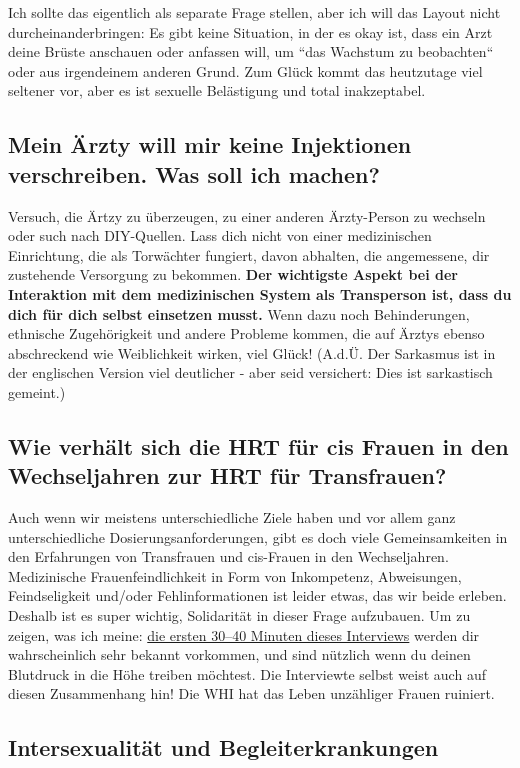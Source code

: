 \documentclass{article}
\begin{document}
Ich sollte das eigentlich als separate Frage stellen, aber ich will das Layout nicht durcheinanderbringen: Es gibt keine Situation, in der es okay ist, dass ein Arzt deine Brüste anschauen oder anfassen will, um “das Wachstum zu beobachten“ oder aus irgendeinem anderen Grund. Zum Glück kommt das heutzutage viel seltener vor, aber es ist sexuelle Belästigung und total inakzeptabel.

\subsection{Mein Ärzty will mir keine Injektionen verschreiben. Was soll ich machen?}

Versuch, die Ärtzy zu überzeugen, zu einer anderen Ärzty-Person zu wechseln oder such nach DIY-Quellen. Lass dich nicht von einer medizinischen Einrichtung, die als Torwächter fungiert, davon abhalten, die angemessene, dir zustehende Versorgung zu bekommen. \textbf{Der wichtigste Aspekt bei der Interaktion mit dem medizinischen System als Transperson ist, dass du dich für dich selbst einsetzen musst. } Wenn dazu noch Behinderungen, ethnische Zugehörigkeit und andere Probleme kommen, die auf Ärztys ebenso abschreckend wie Weiblichkeit wirken, viel Glück! (A.d.Ü. Der Sarkasmus ist in der englischen Version viel deutlicher - aber seid versichert: Dies ist sarkastisch gemeint.)

\subsection{Wie verhält sich die HRT für cis Frauen in den Wechseljahren zur HRT für Transfrauen?}\label{11-29}

Auch wenn wir meistens unterschiedliche Ziele haben und vor allem ganz unterschiedliche Dosierungsanforderungen, gibt es doch viele Gemeinsamkeiten in den Erfahrungen von Transfrauen und cis-Frauen in den Wechseljahren. Medizinische Frauenfeindlichkeit in Form von Inkompetenz, Abweisungen, Feindseligkeit und/oder Fehlinformationen ist leider etwas, das wir beide erleben. Deshalb ist es super wichtig, Solidarität in dieser Frage aufzubauen. Um zu zeigen, was ich meine: \href{https://www.youtube.com/watch?v=W0XW6av2wLQ}{die ersten 30–40 Minuten dieses Interviews} werden dir wahrscheinlich sehr bekannt vorkommen, und sind nützlich wenn du deinen Blutdruck in die Höhe treiben möchtest. Die Interviewte selbst weist auch auf diesen Zusammenhang hin! Die WHI hat das Leben unzähliger Frauen ruiniert.

\subsection*{Intersexualität und Begleiterkrankungen}
\end{document}
